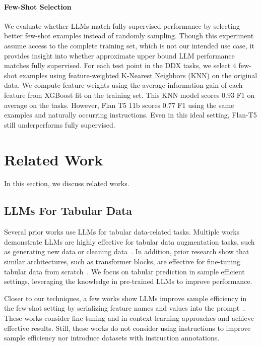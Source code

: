 \paragraph{Few-Shot Selection} We evaluate whether LLMs match fully supervised performance by selecting better few-shot examples instead of randomly sampling. Though this experiment assume access to the complete training set, which is not our intended use case, it provides insight into whether approximate upper bound LLM performance matches fully supervised. For each test point in the DDX tasks, we select $4$ few-shot examples using feature-weighted K-Nearest Neighbors (KNN) on the original data. We compute feature weights using the average information gain of each feature from XGBoost fit on the training set. This KNN model scores $0.93$ F1 on average on the tasks. However, Flan T5 11b scores $0.77$ F1 using the same examples and naturally occurring instructions. Even in this ideal setting, Flan-T5 still underperforms fully supervised.

\section{Related Work}
\label{sec:relatedwork}

In this section, we discuss related works.

\subsection{LLMs For Tabular Data} Several prior works use LLMs for tabular data-related tasks. Multiple works demonstrate LLMs are highly effective for tabular data augmentation tasks, such as generating new data or cleaning data~\cite{narayanAvanikaWrangle, borisov2023language, harari-katz-2022-shot}. In addition, prior research show that similar architectures, such as transformer blocks, are effective for fine-tuning tabular data from scratch~\cite{huang2020tabtransformer, Gorishniy2021RevisitingDL}. We focus on tabular prediction in sample efficient settings, leveraging the knowledge in pre-trained LLMs to improve performance.

Closer to our techniques, a few works show LLMs improve sample efficiency in the few-shot setting by serializing feature names and values into the prompt~\cite{lift, tabllm}. These works consider fine-tuning and in-context learning approaches and achieve effective results. Still, these works do not consider using instructions to improve sample efficiency nor introduce datasets with instruction annotations.

